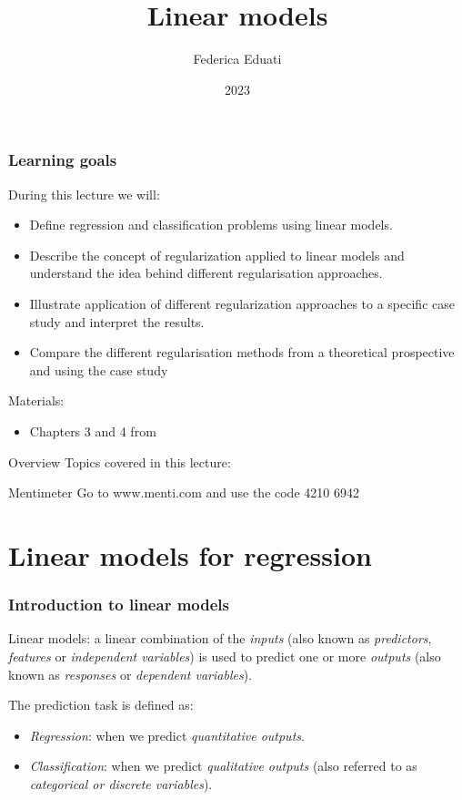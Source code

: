 \documentclass[notes]{beamer}          %
\title{Linear models}
\author{Federica Eduati}
\institute{Eindhoven University of Technology

Department of Biomedical Engineering}
\date{2023}
\begin{document}
 
\frame{\titlepage}
 
\begin{frame}
\frametitle{Learning goals}

During this lecture we will:
\begin{itemize}
	\item Define regression and classification problems using linear models.   
    \item Describe the concept of regularization applied to linear models and understand the idea behind different regularisation approaches. 
    \item Illustrate application of different regularization approaches to a specific case study and interpret the results.
    \item Compare the different regularisation methods from a theoretical prospective and using the case study
\end{itemize}

\vspace{5mm} 

Materials: 
\begin{itemize}
    \item Chapters 3 and 4 from \cite{elements}
\end{itemize}

\end{frame}


\begin{frame}{Overview}
Topics covered in this lecture:
    \tableofcontents
\end{frame}

\begin{frame}{Mentimeter}
Go to www.menti.com and use the code 4210 6942
\end{frame}



\section{Linear models for regression}


\begin{frame}
\frametitle{Introduction to linear models}
Linear models: a linear combination of the \textit{inputs} (also known as \textit{predictors}, \textit{features} or \textit{independent variables}) is used to predict one or more \textit{outputs} (also known as \textit{responses} or \textit{dependent variables}).

\vspace{5mm} 

The prediction task is defined as:
\begin{itemize}
    \item \textit{Regression}: when we predict \textit{quantitative outputs}.
    \item \textit{Classification}: when we predict \textit{qualitative outputs} (also referred to as \textit{categorical or discrete variables}).
\end{itemize}

\end{frame}
\end{document}

